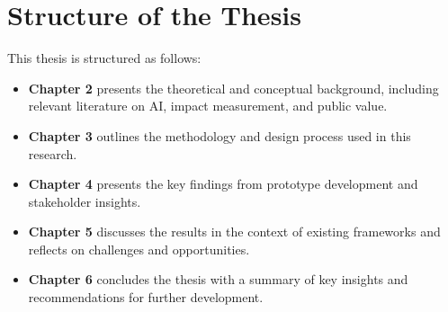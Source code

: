 \section{Structure of the Thesis}\label{sec:structure-of-the-thesis}

This thesis is structured as follows:

\begin{itemize}
\item
\textbf{Chapter 2} presents the theoretical and conceptual background, including relevant literature on AI, impact measurement, and public value.
\item
\textbf{Chapter 3} outlines the methodology and design process used in this research.
\item
\textbf{Chapter 4} presents the key findings from prototype development and stakeholder insights.
\item
\textbf{Chapter 5} discusses the results in the context of existing frameworks and reflects on challenges and opportunities.
\item
\textbf{Chapter 6} concludes the thesis with a summary of key insights and recommendations for further development.
\end{itemize}